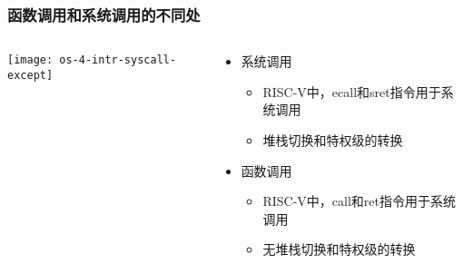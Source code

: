 \begin{frame}[plain]
	\frametitle{函数调用和系统调用的不同处}
	\begin{columns}
		
		\begin{column}{0.45\textwidth}
			\centering
			\texttt{[image: os-4-intr-syscall-except]}
			
		\end{column}
		
		\begin{column}{0.5\textwidth}
		
		  \begin{itemize}  
			\item 系统调用
			\begin{itemize}  
				\item RISC-V中，ecall和sret指令用于系统调用
				\item 堆栈切换和特权级的转换
			\end{itemize}	


			\item 函数调用
			\begin{itemize}  
				\item RISC-V中，call和ret指令用于系统调用
				\item 无堆栈切换和特权级的转换
			\end{itemize}	
			
			\end{itemize}			
		\end{column}
		
	\end{columns}
	
\end{frame}



